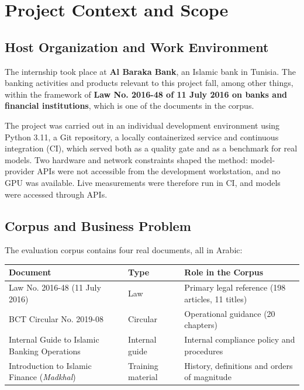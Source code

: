 \documentclass[a4paper,12pt,openany]{report}
\begin{document}
\chapter{Project Context and Scope}

\section{Host Organization and Work Environment}
The internship took place at \textbf{Al Baraka Bank}, an Islamic bank in Tunisia. The banking
activities and products relevant to this project fall, among other things, within the framework of
\textbf{Law No. 2016-48 of 11 July 2016 on banks and financial institutions}, which is one of the
documents in the corpus.

The project was carried out in an individual development environment using Python 3.11, a Git
repository, a locally containerized service and continuous integration (CI), which served both as
a quality gate and as a benchmark for real models. Two hardware and network constraints shaped the
method: model-provider APIs were not accessible from the development workstation, and no GPU was
available. Live measurements were therefore run in CI, and models were accessed through APIs.

\section{Corpus and Business Problem}
The evaluation corpus contains four real documents, all in Arabic:

\begin{table}[htbp]
\centering
\small
\begin{tabular}{p{4.6cm}p{2.9cm}p{6.4cm}}
\toprule
\textbf{Document} & \textbf{Type} & \textbf{Role in the Corpus} \\
\midrule
Law No. 2016-48 (11 July 2016) & Law & Primary legal reference (198 articles, 11 titles) \\
BCT Circular No. 2019-08 & Circular & Operational guidance (20 chapters) \\
Internal Guide to Islamic Banking Operations & Internal guide & Internal compliance policy and
procedures \\
Introduction to Islamic Finance (\emph{Madkhal}) & Training material & History, definitions and
orders of magnitude \\
\bottomrule
\end{tabular}
\end{table}
\end{document}
